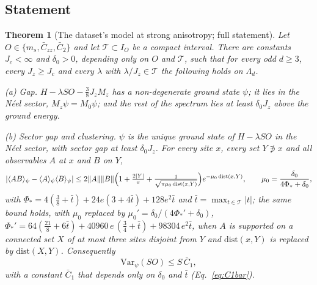 \documentclass[aps,prx,onecolumn,10pt,nofootinbib,longbibliography,floatfix]{revtex4-2}
\newtheorem{theorem}{Theorem}
\theoremstyle{remark}
\newcommand{\Jz}{J_z}
\newcommand{\ms}{m_s}
\newcommand{\Czz}{\bar C_{zz}}
\newcommand{\Ctwo}{\bar C_{2}}
\begin{document}
\subsection{Statement}

\setcounter{theorem}{3} %
\begin{theorem}[The dataset's model at strong anisotropy; full statement]
\label{thm:strongS}
Let $O\in\{\ms,\Czz,\Ctwo\}$ and let $\mathcal T\subset I_O$ be a compact interval. There are constants
$J_c<\infty$ and $\delta_0>0$, depending only on $O$ and $\mathcal T$, such that for every odd $d\ge3$, every $\Jz\ge J_c$ and
every $\lambda$ with $\lambda/\Jz\in\mathcal T$ the following holds on $\Lambda_d$.

\emph{(a) Gap.} $H-\lambda SO-\tfrac38\Jz M_z$ has a non-degenerate ground state $\psi$; it lies in the N\'eel sector,
$M_z\psi=M_0\psi$; and the rest of the spectrum lies at least $\delta_0\Jz$ above the ground energy.

\emph{(b) Sector gap and clustering.} $\psi$ is the unique ground state of $H-\lambda SO$ in the N\'eel sector, with
sector gap at least $\delta_0\Jz$. For every site $x$, every set $Y\not\ni x$ and all observables $A$ at $x$ and $B$
on $Y$,
\begin{equation}
|\langle AB\rangle_\psi-\langle A\rangle_\psi\langle B\rangle_\psi|\le
2\|A\|\|B\|\Bigl(1+\tfrac{2|Y|}{\pi}+\tfrac{1}{\sqrt{\pi\mu_0\,\mathrm{dist}(x,Y)}}\Bigr)e^{-\mu_0\,\mathrm{dist}(x,Y)}, %
\qquad \mu_0=\frac{\delta_0}{4\Phi_*+\delta_0}, %
\label{eq:clust}
\end{equation}
with $\Phi_*=4(\tfrac38+\bar t)+24e(3+4\bar t)+128e^2\bar t$ and $\bar t=\max_{t\in\mathcal T}|t|$; the same bound holds, with %
$\mu_0$ replaced by $\mu_0'=\delta_0/(4\Phi_*'+\delta_0)$,
$\Phi_*'=64(\tfrac{21}{8}+6\bar t)+40960\,e\,(\tfrac34+\bar t)+98304\,e^2\bar t$, when $A$ is supported on a %
connected set $X$ of at most three sites disjoint from $Y$ and $\mathrm{dist}(x,Y)$ is replaced by
$\mathrm{dist}(X,Y)$. Consequently
\begin{equation}
\mathrm{Var}_\psi(SO)\le S\,\bar C_1 , %
\label{eq:var}
\end{equation}
with a constant $\bar C_1$ that depends only on $\delta_0$ and $\bar t$ (Eq.~\eqref{eq:C1bar}).


\end{theorem}
\end{document}
